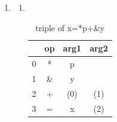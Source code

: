\documentclass[12pt,a4paper]{article}
\makeatletter
\newtheorem*{solution}{Solution}
\renewenvironment{solution}[1][Solution] {\par\pushQED{\qed}\normalfont\topsep6\p@\@plus6\p@\relax\trivlist\item[\hskip\labelsep\bfseries#1\@addpunct{.}]\ignorespaces}{\popQED\endtrivlist\@endpefalse} \makeatother
\makeatother
\begin{document}
\begin{enumerate}
\begin{solution}
\begin{enumerate}
    \item 
    \textrm{\\}
    \begin{table}[h]
    \centering
    \begin{tabular}{|c|c|c|c|}
    \hline
     & op & arg1 & arg2\\
    \hline
    0 & * & p &  \\
    \hline
    1 & \& & y &  \\
    \hline
    2 & + & (0) & (1)\\
    \hline 
    3 & = & x & (2)\\
    \hline
    \end{tabular}
    \caption{triple of x=*p+\&y}
    \end{table}

  \end{enumerate}

\end{solution}


\end{enumerate}
\end{document}
